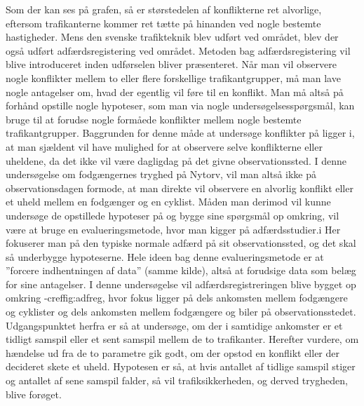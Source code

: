 Som der kan ses på grafen, så er størstedelen af konflikterne ret alvorlige, eftersom trafikanterne kommer ret tætte på hinanden ved nogle bestemte hastigheder.
Mens den svenske trafikteknik blev udført ved området, blev der også udført adfærdsregistering ved området. Metoden bag adfærdsregistering vil blive introduceret inden udførselen bliver præsenteret.
Når	man	vil	observere nogle	konflikter mellem to eller flere	forskellige trafikantgrupper,	må man lave	nogle antagelser	om, hvad	 der egentlig vil føre til en konflikt. Man må altså	på	forhånd	opstille nogle hypoteser, som man via nogle undersøgelsesspørgsmål, kan bruge til	at forudse nogle	formåede	konflikter mellem nogle bestemte	trafikantgrupper.	Baggrunden for denne	måde at	undersøge konflikter	på ligger i,	at man sjældent 	vil	have	mulighed	 for at	observere selve konflikterne	eller uheldene, da det ikke	vil	være	 dagligdag på	 det	 givne observationssted.	I denne	undersøgelse om	fodgængernes tryghed på	Nytorv,	vil man altså ikke på observationsdagen formode,	at man direkte vil observere en alvorlig	 konflikt eller	et uheld mellem	en fodgænger og	en cyklist.	Måden man derimod	vil	kunne undersøge	de opstillede hypoteser på og bygge sine	spørgsmål op omkring, vil	være	at bruge en	evalueringsmetode, hvor	man	kigger på adfærdsstudier.i Her fokuserer	man	på den typiske normale adfærd på	sit observationssted, og	det skal så	underbygge	hypoteserne. Hele ideen bag denne evalueringsmetode er at ”forcere indhentningen af data”	(samme	kilde),	altså at forudsige data	som	belæg for sine antagelser.
I denne undersøgelse vil	adfærdsregistreringen blive bygget op omkring	 -cref{fig:adfreg},	hvor fokus ligger på dels ankomsten mellem fodgængere	 og cyklister og dels ankomsten mellem	fodgængere og biler på observationsstedet. Udgangspunktet herfra er så at	undersøge, om	der i samtidige ankomster er	et tidligt samspil eller	et sent samspil mellem de to trafikanter.
Herefter vurdere, om hændelse ud fra	de to parametre gik godt, om	der	opstod en konflikt	eller der decideret skete et	uheld. Hypotesen er	så,	at hvis	antallet af	tidlige samspil stiger og antallet af sene samspil falder, så vil trafiksikkerheden, og derved trygheden, blive forøget.
